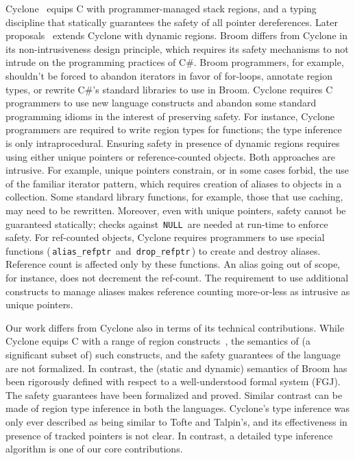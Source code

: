 \documentclass[a4paper,UKenglish]{lipics-v2018}
\newcommand{\C}[1]{\code{#1}}
\newcommand{\code}[1]{\,{\tt #1}\,}
\newcommand{\name}{{\sc Broom}\xspace}
\begin{document}
Cyclone~\cite{cyclone02} equips C with programmer-managed stack
regions, and a typing discipline that statically guarantees the safety
of all pointer dereferences. Later
proposals~\cite{cyclone04,cycloneSCP} extends Cyclone with dynamic
regions. \name differs from Cyclone in its non-intrusiveness design
principle, which requires its safety mechanisms to not intrude on the
programming practices of C\#.  \name programmers, for example,
shouldn't be forced to abandon iterators in favor of for-loops,
annotate region types, or rewrite C\#'s standard libraries to use in
\name. Cyclone requires C programmers to use new language constructs
and abandon some standard programming idioms in the interest of
preserving safety. For instance, Cyclone programmers are required to
write region types for functions; the type inference is only
intraprocedural. Ensuring safety in presence of dynamic regions
requires using either unique pointers or reference-counted objects.
Both approaches are intrusive. For example, unique pointers constrain,
or in some cases forbid, the use of the familiar iterator pattern,
which requires creation of aliases to objects in a collection. Some
standard library functions, for example, those that use caching, may
need to be rewritten.  Moreover, even with unique pointers, safety
cannot be guaranteed statically; checks against \C{NULL} are needed at
run-time to enforce safety. For ref-counted objects, Cyclone requires
programmers to use special functions (\C{alias\_refptr} and
\C{drop\_refptr}) to create and destroy aliases.  Reference count is
affected only by these functions.  An alias going out of scope, for
instance, does not decrement the ref-count. The requirement to use
additional constructs to manage aliases makes reference counting
more-or-less as intrusive as unique pointers.

Our work differs from Cyclone also in terms of its technical
contributions. While Cyclone equips C with a range of region
constructs~\cite{cycloneSCP}, the semantics of (a significant subset
of) such constructs, and the safety guarantees of the language are not
formalized. In contrast, the (static and dynamic) semantics of Broom
has been rigorously defined with respect to a well-understood formal
system (FGJ). The safety guarantees have been formalized and proved.
Similar contrast can be made of region type inference in both the
languages.  Cyclone's type inference was only ever described as being
similar to Tofte and Talpin's, and its effectiveness in presence of
tracked pointers is not clear.  In contrast, a detailed type inference
algorithm is one of our core contributions.
\end{document}
